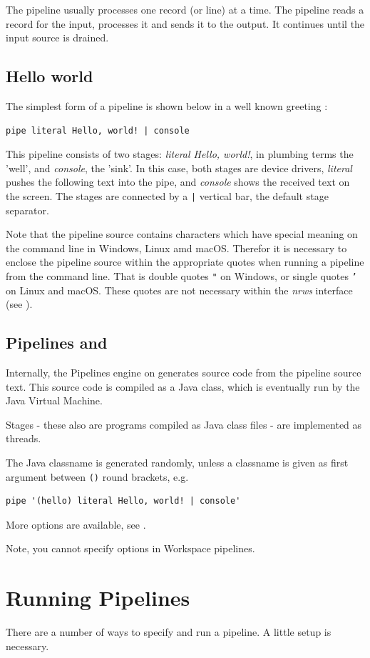 The pipeline usually processes one record (or line) at a time. The
pipeline reads a record for the input, processes it and sends it to
the output. It continues until the input source is drained.

\section{Hello world}
The simplest form of a pipeline is shown below in a well known greeting :
\begin{lstlisting}
pipe literal Hello, world! | console
\end{lstlisting}
This pipeline consists of two stages: \emph{literal Hello, world!}, in plumbing terms the 'well', and
\emph{console}, the 'sink'. In this case, both stages are device drivers, \emph{literal} pushes the following text into
the pipe, and \emph{console} shows the received text on the screen.
The stages are connected by a \texttt{|} vertical bar, the default stage separator.
\begin{shaded}
Note that the pipeline source contains characters which have special meaning on the command line in Windows, Linux amd macOS.
Therefor it is necessary to enclose the pipeline source within the appropriate quotes when running a pipeline from the
command line. That is double quotes \texttt{"} on Windows, or single quotes \texttt{'} on Linux and macOS. These quotes are not
necessary within the \emph{nrws} interface (see \pageref{nrws}).
\end{shaded}
\section{Pipelines and \nr{}}
Internally, the Pipelines engine on \nr{} generates \nr{} source code from the pipeline source text. This \nr{} source code is
compiled as a Java class, which is eventually run by the Java Virtual Machine.

Stages - these also are \nr{} programs compiled as Java class files - are implemented as threads.

The Java classname is generated randomly, unless a classname is given as first argument between \texttt{()} round brackets, e.g.
\begin{lstlisting}
pipe '(hello) literal Hello, world! | console'
\end{lstlisting}
More options are available, see \pageref{pipesrunner}.

Note, you cannot specify options in \nr{} Workspace pipelines.
\chapter{Running Pipelines}
There are a number of ways to specify and run a pipeline. A little setup is necessary.

